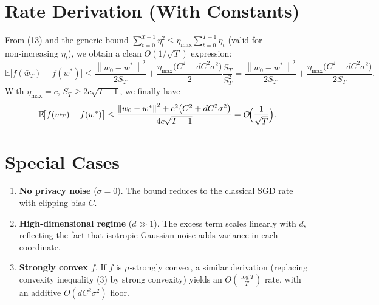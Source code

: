 \documentclass[11pt]{article}
\newcommand{\E}{\mathbb{E}}
\newcommand{\norm}[1]{\left\lVert#1\right\rVert}
\begin{document}
\section*{Rate Derivation (With Constants)}
From (13) and the generic bound $\sum_{t=0}^{T-1}\eta_t^{2}\le \eta_{\max}\sum_{t=0}^{T-1}\eta_t$ (valid for non‑increasing $\eta_t$), we obtain a clean $O(1/\sqrt{T})$ expression:
\[
\E\!\bigl[f(\bar w_T)-f(w^{*})\bigr]
\le
\frac{\norm{w_0-w^{*}}^{2}}{2S_T}
+\frac{\eta_{\max}\bigl(C^{2}+dC^{2}\sigma^{2}\bigr)}{2}
\frac{S_T}{S_T^{2}}
=
\frac{\norm{w_0-w^{*}}^{2}}{2S_T}
+\frac{\eta_{\max}\bigl(C^{2}+dC^{2}\sigma^{2}\bigr)}{2S_T}.
\]
With $\eta_{\max}=c$, $S_T\ge 2c\sqrt{T-1}$, we finally have
\[
\E\!\bigl[f(\bar w_T)-f(w^{*})\bigr]\le
\frac{\norm{w_0-w^{*}}^{2}+c^{2}\bigl(C^{2}+dC^{2}\sigma^{2}\bigr)}{4c\sqrt{T-1}}
=O\!\Bigl(\frac{1}{\sqrt{T}}\Bigr).
\]

\section*{Special Cases}
\begin{enumerate}[label=\arabic*.]
\item \textbf{No privacy noise} ($\sigma=0$). The bound reduces to the classical SGD rate with clipping bias $C$.
\item \textbf{High‑dimensional regime} ($d\gg 1$). The excess term scales linearly with $d$, reflecting the fact that isotropic Gaussian noise adds variance in each coordinate.
\item \textbf{Strongly convex $f$}. If $f$ is $\mu$‑strongly convex, a similar derivation (replacing convexity inequality (3) by strong convexity) yields an $O(\frac{\log T}{T})$ rate, with an additive $O(dC^{2}\sigma^{2})$ floor.
\end{enumerate}
\end{document}
